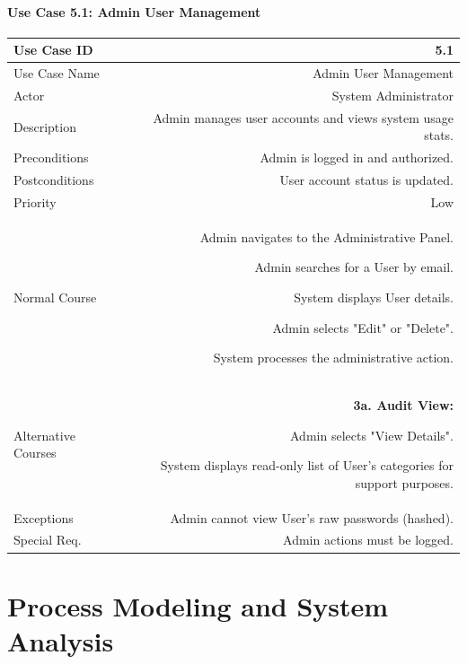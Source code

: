 \documentclass[11pt,a4paper]{report}
\begin{document}
\subsubsection{Use Case 5.1: Admin User Management}
\begin{tabularx}{\textwidth}{|L|R|}
	\hline
	Use Case ID & 5.1 \\ \hline
	Use Case Name & Admin User Management \\ \hline
	Actor & System Administrator \\ \hline
	Description & Admin manages user accounts and views system usage stats. \\ \hline
	Preconditions & Admin is logged in and authorized. \\ \hline
	Postconditions & User account status is updated. \\ \hline
	Priority & Low \\ \hline
	Normal Course & 
	\begin{normalsteps}
		\item Admin navigates to the Administrative Panel.
		\item Admin searches for a User by email.
		\item System displays User details.
		\item Admin selects "Edit" or "Delete".
		\item System processes the administrative action.
	\end{normalsteps} \\ \hline
	Alternative Courses & 
	\textbf{3a. Audit View:} 
	\begin{altsteps}
		\item Admin selects "View Details".
		\item System displays read-only list of User's categories for support purposes.
	\end{altsteps} \\ \hline
	Exceptions & Admin cannot view User's raw passwords (hashed). \\ \hline
	Special Req. & Admin actions must be logged. \\ \hline
\end{tabularx}
	\chapter{Process Modeling and System Analysis}
	
\end{document}
